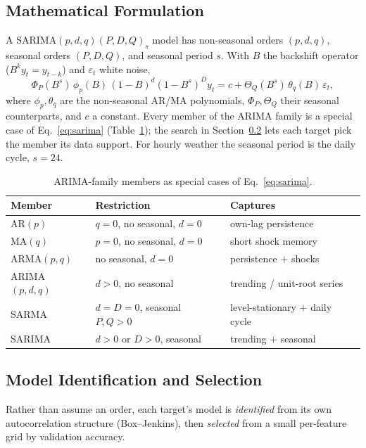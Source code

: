 \documentclass[12pt,a4paper,oneside]{report}
\begin{document}
\subsection{Mathematical Formulation}
A $\text{SARIMA}(p,d,q)(P,D,Q)_s$ model has non-seasonal orders $(p,d,q)$,
seasonal orders $(P,D,Q)$, and seasonal period $s$. With $B$ the backshift
operator ($B^k y_t = y_{t-k}$) and $\varepsilon_t$ white noise,
\begin{equation}
  \Phi_P(B^{s})\,\phi_p(B)\,(1-B)^d (1-B^{s})^{D} y_t
  = c + \Theta_Q(B^{s})\,\theta_q(B)\,\varepsilon_t,
  \label{eq:sarima}
\end{equation}
where $\phi_p,\theta_q$ are the non-seasonal AR/MA polynomials, $\Phi_P,\Theta_Q$
their seasonal counterparts, and $c$ a constant. Every member of the ARIMA family
is a special case of Eq.~\eqref{eq:sarima} (Table~\ref{tab:arima-family}); the
search in Section~\ref{sec:sarima-select} lets each target pick the member its
data support. For hourly weather the seasonal period is the daily cycle, $s=24$.

\begin{table}[H]
\centering
\caption{ARIMA-family members as special cases of Eq.~\eqref{eq:sarima}.}
\label{tab:arima-family}
\begin{tabular}{lll}
\toprule
\textbf{Member} & \textbf{Restriction} & \textbf{Captures} \\
\midrule
AR$(p)$        & $q=0$, no seasonal, $d=0$ & own-lag persistence \\
MA$(q)$        & $p=0$, no seasonal, $d=0$ & short shock memory \\
ARMA$(p,q)$    & no seasonal, $d=0$        & persistence $+$ shocks \\
ARIMA$(p,d,q)$ & $d>0$, no seasonal        & trending / unit-root series \\
SARMA          & $d=D=0$, seasonal $P,Q>0$ & level-stationary $+$ daily cycle \\
SARIMA         & $d>0$ or $D>0$, seasonal  & trending $+$ seasonal \\
\bottomrule
\end{tabular}
\end{table}

\subsection{Model Identification and Selection}
\label{sec:sarima-select}
Rather than assume an order, each target's model is \emph{identified} from its own
autocorrelation structure (Box--Jenkins), then \emph{selected} from a small
per-feature grid by validation accuracy.
\end{document}
